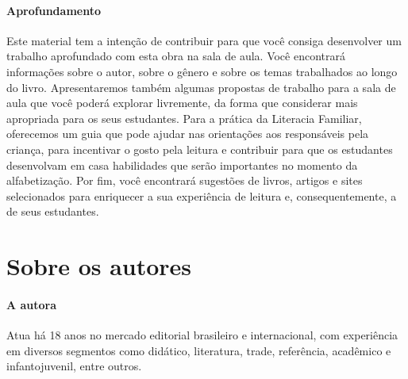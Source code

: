 \documentclass[11pt]{extarticle}
\begin{document}
\paragraph{Aprofundamento} 
Este material tem a intenção de contribuir para que você consiga desenvolver um trabalho aprofundado 
com esta obra na sala de aula. Você encontrará informações sobre o autor, sobre 
o gênero e sobre os temas trabalhados ao longo do livro. Apresentaremos também 
algumas propostas de trabalho para a sala de aula que você poderá explorar livremente, 
da forma que considerar mais apropriada para os seus estudantes. Para a prática 
da Literacia Familiar, oferecemos um guia que pode ajudar nas orientações aos 
responsáveis pela criança, para incentivar o gosto pela leitura e contribuir para 
que os estudantes desenvolvam em casa habilidades que serão importantes no momento 
da alfabetização. Por fim, você encontrará sugestões de livros, artigos e sites 
selecionados para enriquecer a sua experiência de leitura e, 
consequentemente, a de seus estudantes.

\reversemarginpar
\marginparwidth=5cm



\section{Sobre os autores}


\paragraph{A autora}
Atua há 18 anos no 
mercado editorial brasileiro e internacional, com experiência 
em diversos segmentos como didático, literatura, trade, 
referência, acadêmico e infantojuvenil, entre outros. 
\end{document}

